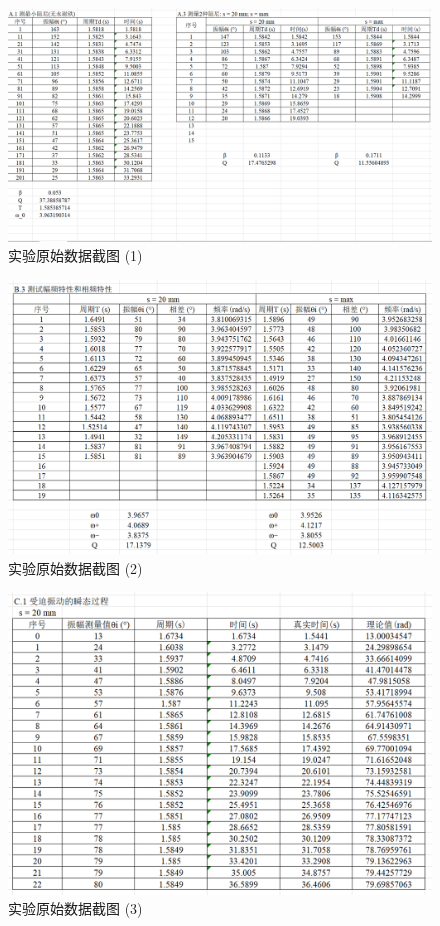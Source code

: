 \documentclass{THUexprep}
\begin{document}
\begin{figure}[h]
    \centering
    \includegraphics[scale=0.3]{yuanshishujv1.png}
    \caption{实验原始数据截图 (1)}
    \label{fig:data}
\end{figure}
\begin{figure}[h]
    \centering
    \includegraphics[scale=0.3]{yuanshishujv2.png}
    \caption{实验原始数据截图 (2)}
    \label{fig:data}
\end{figure}
\begin{figure}[h]
    \centering
    \includegraphics[scale=0.3]{yuanshishujv3.png}
    \caption{实验原始数据截图 (3)}
    \label{fig:data}
\end{figure}
\end{document}
